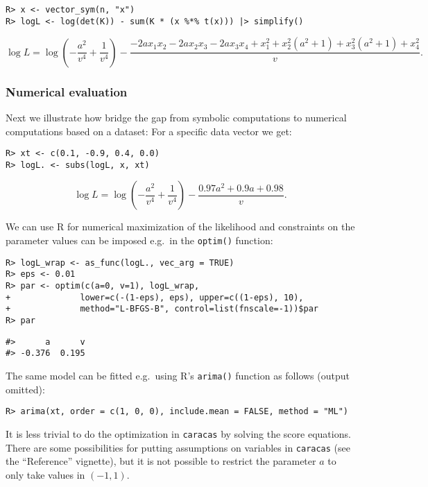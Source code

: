 \begin{verbatim}
R> x <- vector_sym(n, "x")
R> logL <- log(det(K)) - sum(K * (x %*% t(x))) |> simplify()
\end{verbatim}

\[
\log L = \log{\left(- \frac{a^{2}}{v^{4}} + \frac{1}{v^{4}} \right)} - \frac{- 2 a x_{1} x_{2} - 2 a x_{2} x_{3} - 2 a x_{3} x_{4} + x_{1}^{2} + x_{2}^{2} \left(a^{2} + 1\right) + x_{3}^{2} \left(a^{2} + 1\right) + x_{4}^{2}}{v} .
\]

\hypertarget{numerical-evaluation}{%
\subsubsection{Numerical evaluation}\label{numerical-evaluation}}

Next we illustrate how bridge the gap from symbolic computations to numerical computations based on a dataset:
For a specific data vector we get:

\begin{verbatim}
R> xt <- c(0.1, -0.9, 0.4, 0.0)
R> logL. <- subs(logL, x, xt) 
\end{verbatim}

\[
\log L = \log{\left(- \frac{a^{2}}{v^{4}} + \frac{1}{v^{4}} \right)} - \frac{0.97 a^{2} + 0.9 a + 0.98}{v} .
\]

We can use R for numerical maximization of the likelihood and constraints on the
parameter values can be imposed e.g.~in the \texttt{optim()} function:

\begin{verbatim}
R> logL_wrap <- as_func(logL., vec_arg = TRUE)
R> eps <- 0.01
R> par <- optim(c(a=0, v=1), logL_wrap, 
+              lower=c(-(1-eps), eps), upper=c((1-eps), 10),
+              method="L-BFGS-B", control=list(fnscale=-1))$par
R> par
\end{verbatim}

\begin{verbatim}
#>      a      v 
#> -0.376  0.195
\end{verbatim}

The same model can be fitted e.g.~using R's \texttt{arima()} function as follows (output omitted):

\begin{verbatim}
R> arima(xt, order = c(1, 0, 0), include.mean = FALSE, method = "ML")
\end{verbatim}

It is less trivial to do the optimization in \texttt{caracas} by solving the score equations.
There are some possibilities for putting assumptions on variables
in \texttt{caracas} (see the ``Reference'' vignette), but
it is not possible to restrict the parameter \(a\) to only take values in \((-1, 1)\).

